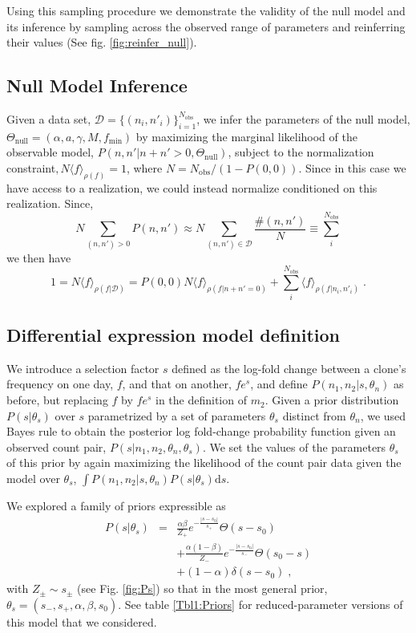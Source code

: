 \documentclass[letterpaper,english,prl,reprint,longbibliography]{revtex4-1} %
\begin{document}
Using this sampling procedure we demonstrate the validity of the null model and its inference by sampling across the observed range of parameters and reinferring their values (See fig. \ref{fig:reinfer_null}).

\subsection*{Null Model Inference}
Given a data set, $\mathcal{D}=\{(n_i,n'_i)\}_{i=1}^{N_{\textrm{obs}}}$, we infer the parameters of the null model, $\Theta_{\textrm{null}}=(\alpha,a,\gamma,M,f_{\textrm{min}})$ by maximizing the marginal likelihood of the observable model, $P(n,n'|n+n'>0,\Theta_{\textrm{null}})$, subject to the normalization constraint$, N\langle f\rangle_{\rho(f)}=1$, where $N=N_{\textrm{obs}}/(1-P(0,0))$. Since in this case we have access to a realization, we could instead normalize conditioned on this realization. Since, 
\begin{equation*}
	N\sum_{(n,n')>0}P(n,n')\approx N\sum_{(n,n')\in \mathcal{D}}\frac{\#(n,n')}{N}\equiv \sum_{i}^{N_{\textrm{obs}}}
\end{equation*}
we then have
\begin{equation}
	1=N\langle f\rangle_{\rho(f|\mathcal{D})}
							   = P(0,0)N\langle f\rangle_{\rho(f|n+n'=0)} + \sum_{i}^{N_{\textrm{obs}}}\langle f\rangle_{\rho(f|n_i,n'_i)}\;.
\end{equation}

\subsection*{Differential expression model definition}
We introduce a selection factor $s$ defined as the log-fold change between a clone's frequency on one day, $f$, and that on another, $fe^s$, and define $P(n_1,n_2|s,\theta_n)$ as before, but replacing $f$ by $fe^s$ in the definition of $m_2$. Given a prior distribution  $P(s|\theta_s)$ over $s$ parametrized by a set of parameters $\theta_s$ distinct from $\theta_n$, we used Bayes rule to obtain the posterior log fold-change probability function given an observed count pair, $P(s|n_1,n_2,\theta_n,\theta_s)$. We set the values of the parameters $\theta_s$ of this prior by again maximizing the likelihood of the count pair data given the model over $\theta_s$, $\int P(n_1,n_2|s,\theta_n)P(s|\theta_s)\textrm{d}s$.

We explored a family of priors expressible as 
\begin{eqnarray}
	P(s|\theta_s)&=&\frac{\alpha \beta}{Z_+}e^{-\frac{|s-s_0|}{s_+}}\Theta(s-s_0) \nonumber\\
	&&+\frac{\alpha (1-\beta)}{Z_-}e^{-\frac{|s-s_0|}{s_-}}\Theta(s_0-s) \\
	&&+(1-\alpha)\delta(s-s_0)\;, \label{eq:genPs}\nonumber
\end{eqnarray}
with $Z_{\pm} \sim s_{\pm}$ (see Fig. \ref{fig:Ps}) so that in the most general prior, $\theta_s=(s_-,s_+,\alpha,\beta,s_0)$. See table \ref{Tbl1:Priors} for reduced-parameter versions of this model that we considered.
\end{document}
